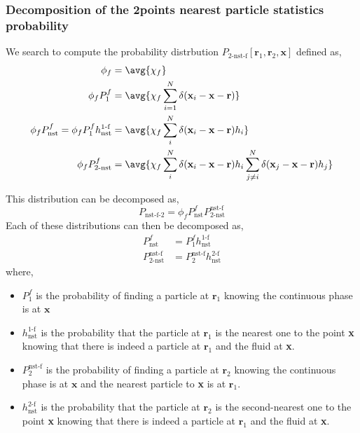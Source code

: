 \subsubsection{Decomposition of the 2points nearest particle statistics probability}

We search to compute the probability distrbution $P_\text{2-nst-f}[\textbf{r}_1,\textbf{r}_2,\textbf{x}]$ defined as, 
\begin{align}
    \phi_f
    &= 
    \avg{\chi_f}\\
    \phi_f P^f_1
    &= 
    \avg{\chi_f \sum_{i=1}^{N}\delta(\textbf{x}_i - \textbf{x} - \textbf{r})}\\
    \phi_f P_\text{nst}^f =
    \phi_f P_1^f h_\text{nst}^\text{1-f}
    &= 
    \avg{\chi_f  
    \sum_i^N \delta(\textbf{x}_i - \textbf{x}- \textbf{r})
    h_i
    }\\
    \phi_f P_\text{2-nst}^f
    &= 
    \avg{\chi_f  
    \sum_i^N \delta(\textbf{x}_i - \textbf{x}- \textbf{r})
    h_i
    \sum_{j\neq i}^N \delta(\textbf{x}_j - \textbf{x}- \textbf{r})
    h_j
    }
\end{align}

This distribution can be decomposed as, 
\begin{equation}
    P_\text{nst-f-2}
    =
    \phi_f
    P_\text{nst}^f
    P_\text{2-nst}^\text{nst-f}
\end{equation}
Each of these distributions can then be decomposed as, 
\begin{align}
    P_\text{nst}^f
    &=
    P_\text{1}^f
    h^\text{1-f}_\text{nst}\\
    P_\text{2-nst}^\text{nst-f}
    &=
    P_\text{2}^\text{nst-f}
    h^\text{2-f}_\text{nst}
\end{align}
where, 
\begin{itemize}
    \item $P_\text{1}^f$ is the probability of finding a particle at $\textbf{r}_1$ knowing the continuous phase is at $\textbf{x}$
    \item $h^\text{1-f}_\text{nst}$ is the probability that the particle at $\textbf{r}_1$ is the nearest one to the point \textbf{x} knowing that there is indeed a particle at $\textbf{r}_1$ and the fluid at \textbf{x}. 
    \item $P_\text{2}^\text{nst-f}$ is the probability of finding a particle at $\textbf{r}_2$ knowing the continuous phase is at $\textbf{x}$ and the nearest particle to \textbf{x} is at $\textbf{r}_1$. 
    \item $h^\text{2-f}_\text{nst}$ is the probability that the particle at $\textbf{r}_2$ is the second-nearest one to the point \textbf{x} knowing that there is indeed a particle at $\textbf{r}_1$ and the fluid at \textbf{x}. 
\end{itemize}

